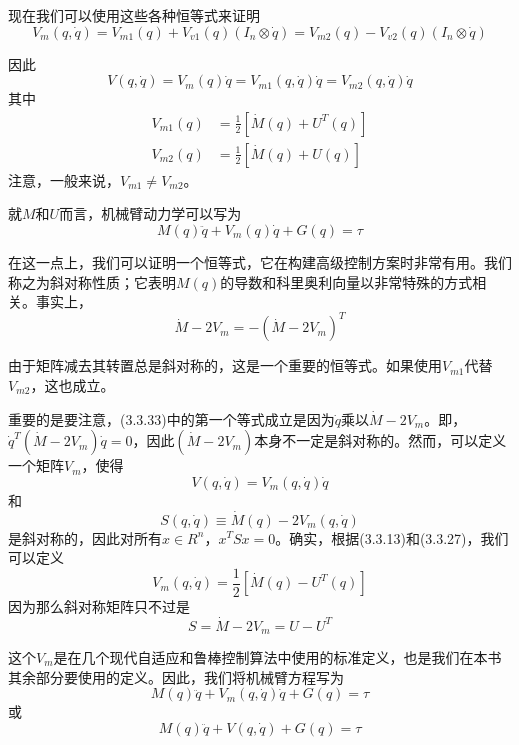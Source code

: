 \documentclass[12pt,a4paper]{ctexart}
\begin{document}
现在我们可以使用这些各种恒等式来证明
\begin{equation}
V_m(q,\dot{q}) = V_{m1}(q) + V_{v1}(q)(I_n \otimes \dot{q}) = V_{m2}(q) - V_{v2}(q)(I_n \otimes \dot{q})
\end{equation}

因此
\begin{equation}
V(q,\dot{q}) = V_m(q)\dot{q} = V_{m1}(q,\dot{q})\dot{q} = V_{m2}(q,\dot{q})\dot{q}
\end{equation}
其中
\begin{align}
V_{m1}(q) &= \frac{1}{2}[\dot{M}(q) + U^T(q)] \\
V_{m2}(q) &= \frac{1}{2}[\dot{M}(q) + U(q)]
\end{align}
注意，一般来说，$V_{m1} \neq V_{m2}$。

就$M$和$U$而言，机械臂动力学可以写为
\begin{equation}
M(q)\ddot{q} + V_m(q)\dot{q} + G(q) = \tau
\end{equation}

在这一点上，我们可以证明一个恒等式，它在构建高级控制方案时非常有用。我们称之为斜对称性质；它表明$M(q)$的导数和科里奥利向量以非常特殊的方式相关。事实上，
\begin{equation}
\dot{M} - 2V_m = -(\dot{M} - 2V_m)^T
\end{equation}

由于矩阵减去其转置总是斜对称的，这是一个重要的恒等式。如果使用$V_{m1}$代替$V_{m2}$，这也成立。

重要的是要注意，(3.3.33)中的第一个等式成立是因为$\dot{q}$乘以$\dot{M} - 2V_m$。即，$\dot{q}^T(\dot{M} - 2V_m)\dot{q} = 0$，因此$(\dot{M} - 2V_m)$本身不一定是斜对称的。然而，可以定义一个矩阵$V_m$，使得
\begin{equation}
V(q,\dot{q}) = V_m(q,\dot{q})\dot{q}
\end{equation}
和
\begin{equation}
S(q,\dot{q}) \equiv \dot{M}(q) - 2V_m(q,\dot{q})
\end{equation}
是斜对称的，因此对所有$x \in R^n$，$x^T S x = 0$。确实，根据(3.3.13)和(3.3.27)，我们可以定义
\begin{equation}
V_m(q,\dot{q}) = \frac{1}{2}[\dot{M}(q) - U^T(q)]
\end{equation}
因为那么斜对称矩阵只不过是
\begin{equation}
S = \dot{M} - 2V_m = U - U^T
\end{equation}

这个$V_m$是在几个现代自适应和鲁棒控制算法中使用的标准定义，也是我们在本书其余部分要使用的定义。因此，我们将机械臂方程写为
\begin{equation}
M(q)\ddot{q} + V_m(q,\dot{q})\dot{q} + G(q) = \tau
\end{equation}
或
\begin{equation}
M(q)\ddot{q} + V(q,\dot{q}) + G(q) = \tau
\end{equation}
\end{document}
